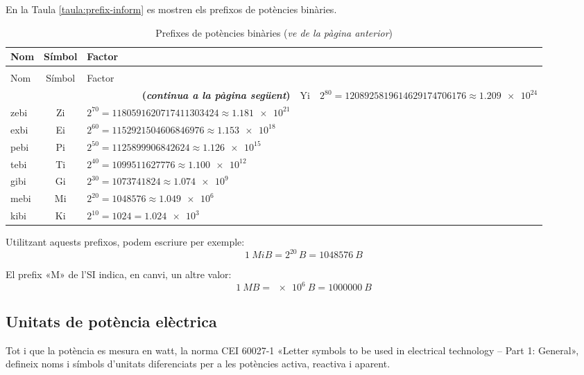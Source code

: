 En la Taula \vref{taula:prefix-inform} es mostren els prefixos de potències binàries.
\begin{longtable}[h]{lcl}
   \caption{\label{taula:prefix-inform} Prefixos de potències binàries}\\
   \toprule[1pt]
    Nom & Símbol  & Factor \\
   \midrule
   \endfirsthead
   \caption[]{Prefixes de potències binàries (\emph{ve de la pàgina anterior})}\\
   \toprule[1pt]
    Nom & Símbol  & Factor \\
   \midrule
   \endhead
   \midrule
   \multicolumn{3}{r}{\sffamily\bfseries\color{NavyBlue}(\emph{continua a la pàgina següent})}
   \endfoot
   \endlastfoot
   yobi & Yi   & $2^{80} = \num{1208925819614629174706176}\approx \num{1,209e24}$ \\
   zebi & Zi   & $2^{70} = \num{1180591620717411303424}\approx \num{1,181e21}$ \\
   exbi & Ei   & $2^{60} = \num{1152921504606846976}\approx \num{1,153e18}$ \\
   pebi & Pi   & $2^{50} = \num{1125899906842624}\approx \num{1,126e15}$ \\
   tebi & Ti   & $2^{40} = \num{1099511627776}\approx \num{1,100e12}$ \\
   gibi & Gi   & $2^{30} = \num{1073741824}\approx \num{1,074e9}$  \\
   mebi & Mi   & $2^{20} = \num{1048576} \approx \num{1,049e6}$ \\
   kibi & Ki   & $2^{10} = 1024 =\num{1,024e3}$  \\
   \bottomrule[1pt]
\end{longtable}
        
   

Utilitzant aquests prefixos, podem escriure per exemple:
\[\SI{1}{MiB} = 2^{20}\si{\,B} = \SI{1048576}{B}\]

El prefix «M» de l'SI indica, en canvi, un altre valor:
\[\SI{1}{MB} =\SI{e6}{B} = \SI{1000000}{B}\]


\subsection{Unitats de potència elèctrica}

Tot i que la potència es mesura en watt, la norma CEI 60027-1 «Letter symbols to be used in electrical technology -- Part 1: General», defineix noms i símbols d'unitats diferenciats per a les potències activa, reactiva i aparent.

